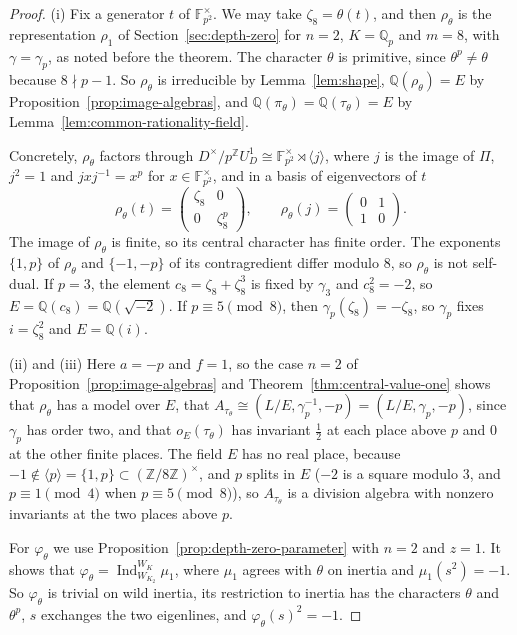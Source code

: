 \documentclass[a4paper,11pt]{amsart}
\theoremstyle{definition}
\theoremstyle{remark}
\numberwithin{equation}{section}
\newcommand{\Q}{\mathbb{Q}}
\newcommand{\Z}{\mathbb{Z}}
\newcommand{\F}{\mathbb{F}}
\DeclareMathOperator{\Ind}{Ind}
\begin{document}
\begin{proof}
(i) Fix a generator $t$ of $\F_{p^2}^\times$. We may take $\zeta_8=\theta(t)$, and then $\rho_\theta$ is the representation $\rho_1$ of Section~\ref{sec:depth-zero} for $n=2$, $K=\Q_p$ and $m=8$, with $\gamma=\gamma_p$, as noted before the theorem. The character $\theta$ is primitive, since $\theta^p\neq\theta$ because $8\nmid p-1$. So $\rho_\theta$ is irreducible by Lemma~\ref{lem:shape}, $\Q(\rho_\theta)=E$ by Proposition~\ref{prop:image-algebras}, and $\Q(\pi_\theta)=\Q(\tau_\theta)=E$ by Lemma~\ref{lem:common-rationality-field}.

Concretely, $\rho_\theta$ factors through $D^\times/p^{\Z}U_D^1\cong\F_{p^2}^\times\rtimes\langle j\rangle$, where $j$ is the image of $\Pi$, $j^2=1$ and $jxj^{-1}=x^p$ for $x\in\F_{p^2}^\times$, and in a basis of eigenvectors of $t$
\[
 \rho_\theta(t)=\begin{pmatrix}\zeta_8&0\\0&\zeta_8^{p}\end{pmatrix},\qquad \rho_\theta(j)=\begin{pmatrix}0&1\\1&0\end{pmatrix}.
\]
The image of $\rho_\theta$ is finite, so its central character has finite order. The exponents $\{1,p\}$ of $\rho_\theta$ and $\{-1,-p\}$ of its contragredient differ modulo $8$, so $\rho_\theta$ is not self-dual. If $p=3$, the element $c_8=\zeta_8+\zeta_8^3$ is fixed by $\gamma_3$ and $c_8^2=-2$, so $E=\Q(c_8)=\Q(\sqrt{-2})$. If $p\equiv5\pmod8$, then $\gamma_p(\zeta_8)=-\zeta_8$, so $\gamma_p$ fixes $i=\zeta_8^2$ and $E=\Q(i)$.

(ii) and (iii) Here $a=-p$ and $f=1$, so the case $n=2$ of Proposition~\ref{prop:image-algebras} and Theorem~\ref{thm:central-value-one} shows that $\rho_\theta$ has a model over $E$, that $A_{\tau_\theta}\cong(L/E,\gamma_p^{-1},-p)=(L/E,\gamma_p,-p)$, since $\gamma_p$ has order two, and that $o_E(\tau_\theta)$ has invariant $\frac12$ at each place above $p$ and $0$ at the other finite places. The field $E$ has no real place, because $-1\notin\langle p\rangle=\{1,p\}\subset(\Z/8\Z)^\times$, and $p$ splits in $E$ ($-2$ is a square modulo $3$, and $p\equiv1\pmod4$ when $p\equiv5\pmod8$), so $A_{\tau_\theta}$ is a division algebra with nonzero invariants at the two places above $p$.

For $\varphi_\theta$ we use Proposition~\ref{prop:depth-zero-parameter} with $n=2$ and $z=1$. It shows that $\varphi_\theta=\Ind_{W_{K_2}}^{W_K}\mu_1$, where $\mu_1$ agrees with $\theta$ on inertia and $\mu_1(s^2)=-1$. So $\varphi_\theta$ is trivial on wild inertia, its restriction to inertia has the characters $\theta$ and $\theta^p$, $s$ exchanges the two eigenlines, and $\varphi_\theta(s)^2=-1$.


\end{proof}
\end{document}
